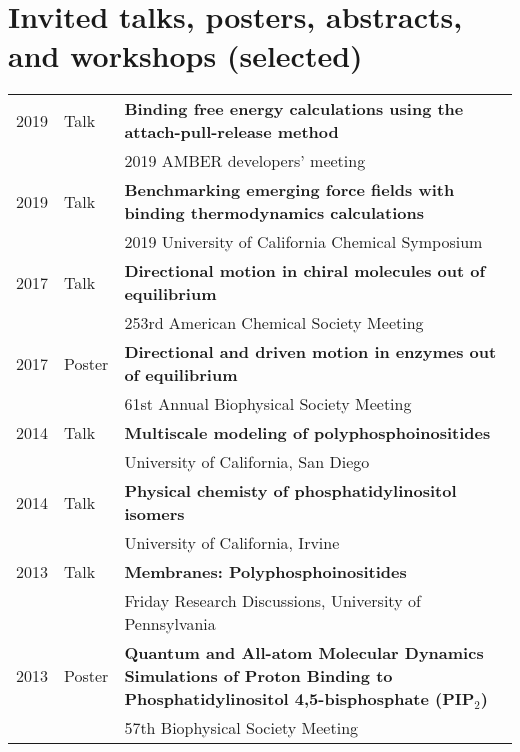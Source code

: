 \documentclass[letterpaper,11pt]{article}
\begin{document}
\section{Invited talks, posters, abstracts, and workshops (selected)}
\begin{tabular}{ll p{14 cm}}
2019 & Talk & \bf{Binding free energy calculations using the attach-pull-release method} \\
&& 2019 AMBER developers' meeting \\
2019 & Talk & \bf{Benchmarking emerging force fields with binding thermodynamics calculations} \\
&& 2019 University of California Chemical Symposium \\

2017 & Talk & \textbf{Directional motion in chiral molecules out of equilibrium} \\
     && 253rd American Chemical Society Meeting \\
2017 & Poster & \textbf{Directional and driven motion in enzymes out of equilibrium} \\
     && 61st Annual Biophysical Society Meeting \\     
2014 & Talk & \textbf{Multiscale modeling of polyphosphoinositides}\\
     && University of California, San Diego\\
2014 & Talk & \textbf{Physical chemisty of phosphatidylinositol isomers}\\
     && University of California, Irvine\\
2013 & Talk & \textbf{Membranes: Polyphosphoinositides}\\
     && Friday Research Discussions, University of Pennsylvania\\
2013 & Poster & \textbf{Quantum and All-atom Molecular Dynamics Simulations of Proton   Binding to Phosphatidylinositol 4,5-bisphosphate (PIP$_2$)}\\
     && 57th Biophysical Society Meeting\\

\end{tabular}
\end{document}
